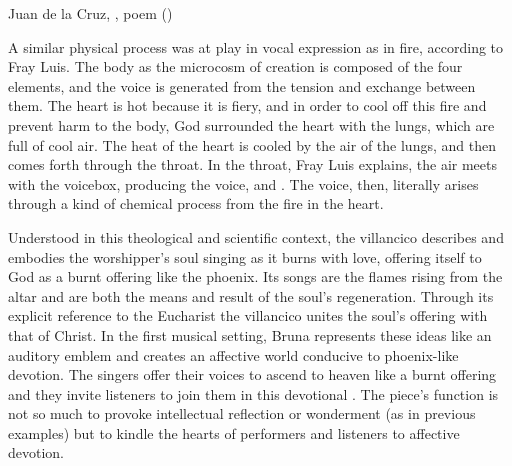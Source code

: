 {Juan de la Cruz, , poem ()}

A similar physical process was at play in vocal expression as in fire,
according to Fray Luis.
The body as the microcosm of creation is composed of the four elements, and the
voice is generated from the tension and exchange between them.
The heart is hot because it is fiery, and in order to cool off this fire and
prevent harm to the body, God surrounded the heart with the lungs, which are
full of cool air. 
The heat of the heart is cooled by the air of the lungs, and then comes forth
through the throat.
In the throat, Fray Luis explains, the air meets with the voicebox, producing
the voice, and .%
    \Autocite[435]{LuisdeGranada:Simbolo}
The voice, then, literally arises through a kind of chemical process from the
fire in the heart.
	
Understood in this theological and scientific context, the villancico
 describes and embodies the worshipper's soul singing
as it burns with love, offering itself to God as a burnt offering like the
phoenix.
Its songs are the flames rising from the altar and are both the means and
result of the soul's regeneration.
Through its explicit reference to the Eucharist the villancico unites the
soul's offering with that of Christ.
In the first musical setting, Bruna represents these ideas like an auditory
emblem and creates an affective world conducive to phoenix-like devotion.
The singers offer their voices to ascend to heaven like a burnt offering and
they invite listeners to join them in this devotional .
The piece's function is not so much to provoke intellectual reflection or
wonderment (as in previous examples) but to kindle the hearts of performers and
listeners to affective devotion.


